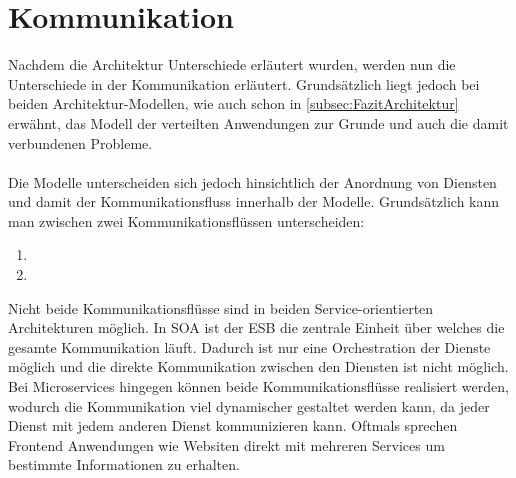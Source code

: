 \section{Kommunikation}
\label{sec:FazitKommunikation}
Nachdem die Architektur Unterschiede erläutert wurden, werden nun die Unterschiede in der Kommunikation erläutert. Grundsätzlich liegt jedoch bei beiden Architektur-Modellen, wie auch schon in \ref{subsec:FazitArchitektur}  erwähnt, das Modell der verteilten Anwendungen zur Grunde und auch die damit verbundenen Probleme.
\\\\
Die Modelle unterscheiden sich jedoch hinsichtlich der Anordnung von Diensten und damit der Kommunikationsfluss innerhalb der Modelle. Grundsätzlich kann man zwischen zwei Kommunikationsflüssen unterscheiden:
\begin{enumerate}
    \item {}
    \item {}
\end{enumerate}
Nicht beide Kommunikationsflüsse sind in beiden Service-orientierten Architekturen möglich. In SOA ist der ESB die zentrale Einheit über welches die gesamte Kommunikation läuft. Dadurch ist nur eine Orchestration der Dienste möglich und die direkte Kommunikation  zwischen den Diensten ist nicht möglich. Bei Microservices hingegen können beide Kommunikationsflüsse realisiert werden, wodurch die Kommunikation viel dynamischer gestaltet werden kann, da jeder Dienst mit jedem anderen Dienst kommunizieren kann. Oftmals sprechen Frontend Anwendungen wie Websiten direkt mit mehreren Services um bestimmte Informationen zu erhalten.

